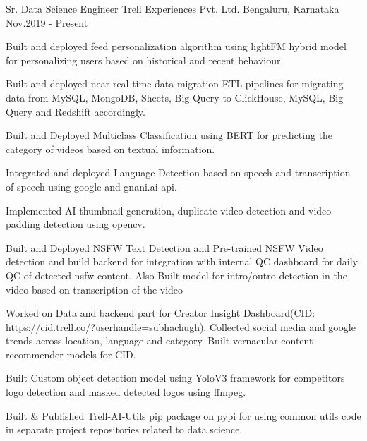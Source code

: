 



\begin{cventries}

 \cventry
    {Sr. Data Science Engineer} %
    {Trell Experiences Pvt. Ltd.} %
    {Bengaluru, Karnataka} %
    {Nov.2019 - Present} %
    { 
      \begin{cvitems} %
        \item {Built and deployed feed personalization algorithm using lightFM hybrid model for personalizing users based on historical and recent behaviour.}
        \item {Built and deployed near real time data migration ETL pipelines for migrating data from MySQL, MongoDB, Sheets, Big Query to ClickHouse, MySQL, Big Query and Redshift accordingly. }
        \item {Built and Deployed Multiclass Classification using BERT for predicting the category of videos based on textual information. }
        \item {Integrated and deployed Language Detection based on speech and transcription of speech using google and gnani.ai api. }
        \item {Implemented AI thumbnail generation, duplicate video detection and video padding detection using opencv.}
        \item {Built and Deployed NSFW Text Detection and Pre-trained NSFW Video detection and build backend for integration with internal QC dashboard for daily QC of detected nsfw content. Also Built model for intro/outro detection in the video based on transcription of the video}
        \item {Worked on Data and backend part for Creator Insight Dashboard(CID: \url{https://cid.trell.co/?userhandle=subhachugh}). Collected social media and google trends across location, language and category. Built vernacular content recommender models for CID.}
        \item {Built Custom object detection model using YoloV3 framework for competitors logo detection and masked detected logos using ffmpeg.}
        \item {Built \& Published Trell-AI-Utils pip package on pypi for using common utils code in separate project repositories related to data science.}

\end{cvitems}}
\end{cventries}
